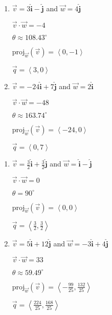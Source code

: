 \documentclass{ximera}
\begin{document}
\begin{multicols}{2} \raggedcolumns 
\begin{enumerate}
\setcounter{enumi}{\value{HW}}


\item $\vec{v} =3 \bm\hat{\text{i}}-  \bm\hat{\text{j}}$ and $\vec{w} = 4 \bm\hat{\text{j}}$

 $\vec{v} \cdot \vec{w} = -4$

 $\theta \approx 108.43^{\circ}$ 

 $\text{proj}_{\vec{w}}(\vec{v}) = \left\langle 0,-1 \right\rangle$

 $\vec{q} = \left\langle 3,0 \right\rangle$

\vfill

\item $\vec{v} = -24 \bm\hat{\text{i}}+ 7 \bm\hat{\text{j}}$ and $\vec{w} = 2 \bm\hat{\text{i}}$

 $\vec{v} \cdot \vec{w} = -48$

 $\theta \approx 163.74^{\circ}$ 

 $\text{proj}_{\vec{w}}(\vec{v}) = \left\langle -24,0 \right\rangle$

 $\vec{q} = \left\langle 0,7\right\rangle$
 
\setcounter{HW}{\value{enumi}}
\end{enumerate}
\end{multicols}



\begin{multicols}{2} \raggedcolumns 
\begin{enumerate}
\setcounter{enumi}{\value{HW}}


\item  $\vec{v} =\frac{3}{2}  \bm\hat{\text{i}}+ \frac{3}{2}  \bm\hat{\text{j}}$ and $\vec{w} =  \bm\hat{\text{i}}-  \bm\hat{\text{j}}$

 $\vec{v} \cdot \vec{w} = 0$

 $\theta = 90^{\circ}$ 

 $\text{proj}_{\vec{w}}(\vec{v}) = \left\langle 0,0 \right\rangle$

 $\vec{q} = \left\langle \frac{3}{2},\frac{3}{2} \right\rangle$

\vfill

\item $\vec{v} = 5 \bm\hat{\text{i}}+ 12 \bm\hat{\text{j}}$ and $\vec{w} = -3 \bm\hat{\text{i}}+ 4 \bm\hat{\text{j}}$

 $\vec{v} \cdot \vec{w} = 33$

 $\theta \approx  59.49^{\circ}$ 

 $\text{proj}_{\vec{w}}(\vec{v}) = \left\langle -\frac{99}{25}, \frac{132}{25} \right\rangle$

 $\vec{q} = \left\langle \frac{224}{25},\frac{168}{25} \right\rangle$
 
\setcounter{HW}{\value{enumi}}
\end{enumerate}
\end{multicols}
\end{document}
